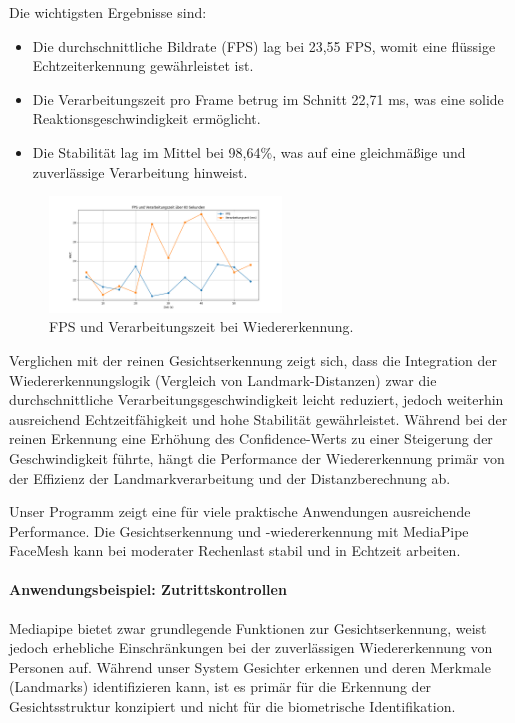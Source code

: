 Die wichtigsten Ergebnisse sind:
\begin{itemize}
    \item Die durchschnittliche Bildrate (FPS) lag bei 23,55 FPS, womit eine flüssige Echtzeiterkennung gewährleistet ist.
    \item Die Verarbeitungszeit pro Frame betrug im Schnitt 22,71 ms, was eine solide Reaktionsgeschwindigkeit ermöglicht.
    \item Die Stabilität lag im Mittel bei 98,64\%, was auf eine gleichmäßige und zuverlässige Verarbeitung hinweist.
\end{itemize}

\begin{figure}[ht]
    \centering
    \includegraphics[width=0.55\textwidth]{data/FPS_and_Processing_Time.png}
    \caption{FPS und Verarbeitungszeit bei Wiedererkennung.}
    \label{fig:fps_recognition_mediapipe}
\end{figure}

Verglichen mit der reinen Gesichtserkennung zeigt sich, dass die Integration der Wiedererkennungslogik (Vergleich von Landmark-Distanzen) zwar die durchschnittliche Verarbeitungsgeschwindigkeit leicht reduziert, jedoch weiterhin ausreichend Echtzeitfähigkeit und hohe Stabilität gewährleistet. 
Während bei der reinen Erkennung eine Erhöhung des Confidence-Werts zu einer Steigerung der Geschwindigkeit führte, hängt die Performance der Wiedererkennung primär von der Effizienz der Landmarkverarbeitung und der Distanzberechnung ab.

Unser Programm zeigt eine für viele praktische Anwendungen ausreichende Performance. Die Gesichtserkennung und -wiedererkennung mit MediaPipe FaceMesh kann bei moderater Rechenlast stabil und in Echtzeit arbeiten. 


\paragraph{Anwendungsbeispiel: Zutrittskontrollen}

Mediapipe bietet zwar grundlegende Funktionen zur Gesichtserkennung, weist jedoch erhebliche Einschränkungen bei der zuverlässigen Wiedererkennung von Personen auf. 
Während unser System Gesichter erkennen und deren Merkmale (Landmarks) identifizieren kann, ist es primär für die Erkennung der Gesichtsstruktur konzipiert und nicht für die biometrische Identifikation.

